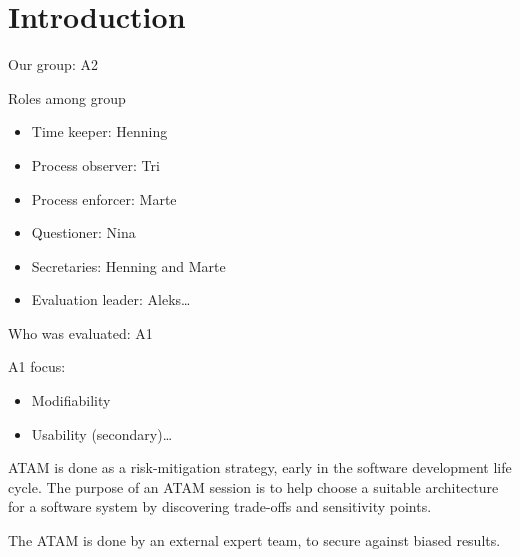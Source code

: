\section{Introduction}
\label{sec:introduction}

Our group: A2

Roles among group
\begin{itemize}
  \item Time keeper: Henning
  \item Process observer: Tri
  \item Process enforcer: Marte
  \item Questioner: Nina
  \item Secretaries: Henning and Marte
  \item Evaluation leader: Aleks\ldots
\end{itemize}

Who was evaluated: A1


A1 focus: 
	\begin{itemize}
  \item Modifiability
  \item Usability (secondary)\ldots
\end{itemize}


ATAM is done as a risk-mitigation strategy, early in the software development
life cycle. The purpose of an ATAM session is to help choose a suitable
architecture for a software system by discovering trade-offs and sensitivity
points. 

The ATAM is done by an external expert team, to secure against biased results. 
